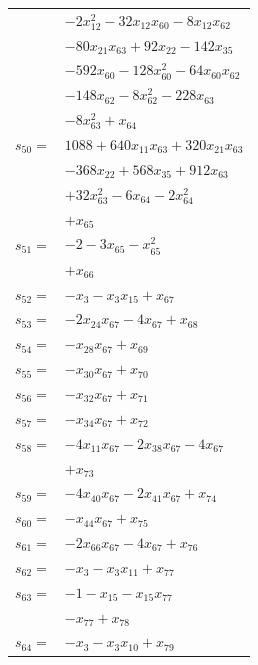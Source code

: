 \begin{longtable}{@{}r@{\;}l@{}}
 & \(\displaystyle -2x_{12}^{2} -32x_{12}x_{60} -8x_{12}x_{62}\) \\
 & \(\displaystyle -80x_{21}x_{63} +92x_{22} -142x_{35}\) \\
 & \(\displaystyle -592x_{60} -128x_{60}^{2} -64x_{60}x_{62}\) \\
 & \(\displaystyle -148x_{62} -8x_{62}^{2} -228x_{63}\) \\
 & \(\displaystyle -8x_{63}^{2} +x_{64}\) \\[3pt]
\(s_{50}=\) & \(\displaystyle 1088 +640x_{11}x_{63} +320x_{21}x_{63}\) \\
 & \(\displaystyle -368x_{22} +568x_{35} +912x_{63}\) \\
 & \(\displaystyle +32x_{63}^{2} -6x_{64} -2x_{64}^{2}\) \\
 & \(\displaystyle +x_{65}\) \\[3pt]
\(s_{51}=\) & \(\displaystyle -2 -3x_{65} -x_{65}^{2}\) \\
 & \(\displaystyle +x_{66}\) \\[3pt]
\(s_{52}=\) & \(\displaystyle -x_{3} -x_{3}x_{15} +x_{67}\) \\[3pt]
\(s_{53}=\) & \(\displaystyle -2x_{24}x_{67} -4x_{67} +x_{68}\) \\[3pt]
\(s_{54}=\) & \(\displaystyle -x_{28}x_{67} +x_{69}\) \\[3pt]
\(s_{55}=\) & \(\displaystyle -x_{30}x_{67} +x_{70}\) \\[3pt]
\(s_{56}=\) & \(\displaystyle -x_{32}x_{67} +x_{71}\) \\[3pt]
\(s_{57}=\) & \(\displaystyle -x_{34}x_{67} +x_{72}\) \\[3pt]
\(s_{58}=\) & \(\displaystyle -4x_{11}x_{67} -2x_{38}x_{67} -4x_{67}\) \\
 & \(\displaystyle +x_{73}\) \\[3pt]
\(s_{59}=\) & \(\displaystyle -4x_{40}x_{67} -2x_{41}x_{67} +x_{74}\) \\[3pt]
\(s_{60}=\) & \(\displaystyle -x_{44}x_{67} +x_{75}\) \\[3pt]
\(s_{61}=\) & \(\displaystyle -2x_{66}x_{67} -4x_{67} +x_{76}\) \\[3pt]
\(s_{62}=\) & \(\displaystyle -x_{3} -x_{3}x_{11} +x_{77}\) \\[3pt]
\(s_{63}=\) & \(\displaystyle -1 -x_{15} -x_{15}x_{77}\) \\
 & \(\displaystyle -x_{77} +x_{78}\) \\[3pt]
\(s_{64}=\) & \(\displaystyle -x_{3} -x_{3}x_{10} +x_{79}\) \\[3pt]

\end{longtable}

